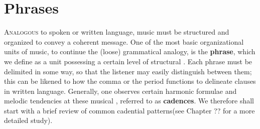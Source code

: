 \chapter{Phrases}\label{chapter:phrases}

\lettrine[loversize=0.1, lines=3, findent=2pt]{\color{BlueViolet!75}A}{nalogous} to spoken or written language, music must be structured and organized to convey a coherent message. One of the most basic organizational units of music, to continue the (loose) grammatical analogy, is the \textbf{phrase}, which we define as a unit possessing a certain level of structural . Each phrase must be delimited in some way, so that the listener may easily distinguish between them; this can be likened to how the comma or the period functions to delineate clauses in written language. Generally, one observes certain harmonic formulae and melodic tendencies at these musical , referred to as \textbf{cadences}. We therefore shall start with a brief review of common cadential patterns(see Chapter ?? for a more detailed study).



